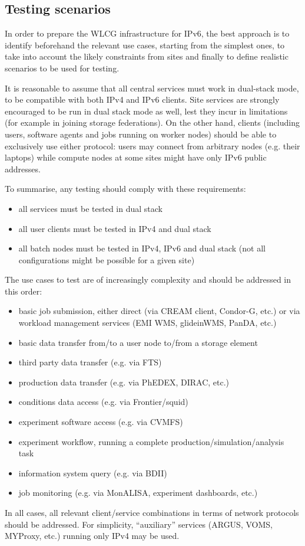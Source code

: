 \subsection{Testing scenarios}
In order to prepare the WLCG infrastructure for IPv6, the best
approach is to identify beforehand the relevant use cases, starting
from the simplest ones, to take into account the likely constraints
from sites and finally to define realistic scenarios to be used for
testing.

It is reasonable to assume that all central services must work in
dual-stack mode, to be compatible with both IPv4 and IPv6
clients. Site services are strongly encouraged to be run in dual stack
mode as well, lest they incur in limitations (for example in joining
storage federations). On the other hand, clients (including users,
software agents and jobs running on worker nodes) should be able to
exclusively use either protocol: users may connect from arbitrary
nodes (e.g. their laptops) while compute nodes at some sites might have
only IPv6 public addresses.

To summarise, any testing should comply with these requirements:
\begin{itemize}
\item all services must be tested in dual stack
\item all user clients must be tested in IPv4 and dual stack
\item all batch nodes must be tested in IPv4, IPv6 and dual stack (not all configurations might be possible for a given site)
\end{itemize}

The use cases to test are of increasingly complexity and should be addressed in this order:
\begin{itemize}
\item basic job submission, either direct (via CREAM client, Condor-G, etc.) or via workload management services (EMI WMS, glideinWMS, PanDA, etc.)
\item basic data transfer from/to a user node to/from a storage element
\item third party data transfer (e.g. via FTS)
\item production data transfer (e.g. via PhEDEX, DIRAC, etc.)
\item conditions data access (e.g. via Frontier/squid)
\item experiment software access (e.g. via CVMFS)
\item experiment workflow, running a complete production/simulation/analysis task
\item information system query (e.g. via BDII)
\item job monitoring (e.g. via MonALISA, experiment dashboards, etc.)
\end{itemize}
In all cases, all relevant client/service combinations in terms of network protocols should be addressed. For simplicity, ``auxiliary'' services (ARGUS, VOMS, MYProxy, etc.) running only IPv4 may be used.


